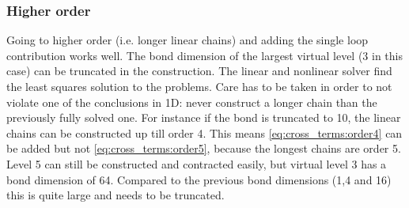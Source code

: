 \subsubsection{Higher order}

Going to higher order (i.e. longer linear chains) and adding the single loop contribution works well. The bond dimension of the largest virtual level (3 in this case) can be truncated in the construction. The linear and nonlinear solver find the least squares solution to the problems. Care has to be taken in order to not violate one of the conclusions in 1D: never construct a longer chain than the previously fully solved one. For instance if the bond is truncated to 10, the linear chains can be constructed up till order 4. This means \cref{eq:cross_terms:order4} can be added but not \cref{eq:cross_terms:order5}, because the longest chains are order 5. Level 5 can still be constructed and contracted easily, but virtual level 3 has a bond dimension of 64. Compared to the previous bond dimensions (1,4 and 16) this is quite large and needs to be truncated.

